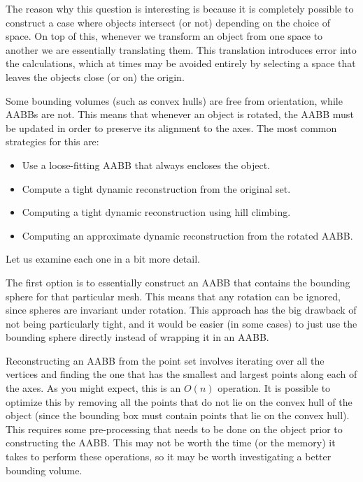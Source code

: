 \documentclass[11pt, letterpaper, oneside]{article}
\begin{document}
        The reason why this question is interesting is because it is completely
        possible to construct a case where objects intersect (or not) depending
        on the choice of space. On top of this, whenever we transform an object
        from one space to another we are essentially translating them. This
        translation introduces error into the calculations, which at times may
        be avoided entirely by selecting a space that leaves the objects close
        (or on) the origin.

        Some bounding volumes (such as convex hulls) are free from orientation,
        while AABBs are not. This means that whenever an object is rotated, the
        AABB must be updated in order to preserve its alignment to the axes.
        The most common strategies for this are:
        \begin{itemize}
          \item Use a loose-fitting AABB that always encloses the object.
          \item Compute a tight dynamic reconstruction from the original set.
          \item Computing a tight dynamic reconstruction using hill climbing.
          \item Computing an approximate dynamic reconstruction from the
            rotated AABB.
        \end{itemize}
        Let us examine each one in a bit more detail.

        The first option is to essentially construct an AABB that contains the
        bounding sphere for that particular mesh. This means that any rotation
        can be ignored, since spheres are invariant under rotation. This
        approach has the big drawback of not being particularly tight, and it
        would be easier (in some cases) to just use the bounding sphere directly
        instead of wrapping it in an AABB.

        Reconstructing an AABB from the point set involves iterating over all
        the vertices and finding the one that has the smallest and largest
        points along each of the axes. As you might expect, this is an $O(n)$
        operation. It is possible to optimize this by removing all the points
        that do not lie on the convex hull of the object (since the bounding box
        must contain points that lie on the convex hull). This requires some
        pre-processing that needs to be done on the object prior to constructing
        the AABB. This may not be worth the time (or the memory) it takes to
        perform these operations, so it may be worth investigating a better
        bounding volume.
\end{document}
